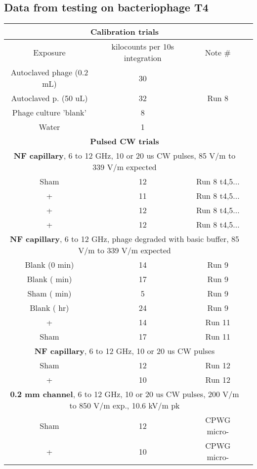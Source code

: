\documentclass[paper.tex]{subfiles}
\begin{document}
\subsection{Data from testing on bacteriophage T4}

\begin{table}[h!]
	\centering
	\begin{tabular}{ |c|c|c|c| } 
				\hline
		\multicolumn{3}{|c|}{\textbf{Calibration trials} } \\
		\hline
		\hline
		Exposure & kilocounts per 10s integration & Note \# \\
		\hline
		Autoclaved phage (0.2 mL) & 30 & \\ 
		Autoclaved p. (50 uL) & 32 & Run 8\\ 
		\hline
		Phage culture 'blank' & 8 & \\ 
		Water & 1 & \\

		\hline
\multicolumn{3}{|c|}{\textbf{Pulsed CW trials}} \\
\hline


		\hline
		\multicolumn{3}{|c|}{\textbf{NF capillary}, 6 to 12 GHz, 10 or 20 us CW pulses, 85 V/m to 339 V/m expected} \\
		\hline
		Sham   & 12 & Run 8 t4,5...\\
		+ & 11 & Run 8 t4,5...\\
		+  & 12 & Run 8 t4,5...\\
		+  & 12 & Run 8 t4,5...\\
		\hline
		\multicolumn{3}{|c|}{\textbf{NF capillary}, 6 to 12 GHz, phage degraded with basic buffer, 85 V/m to 339 V/m expected} \\
		\hline
		Blank (0 min) & 14 & Run 9 \\
		Blank (\ntilde 15 min) & 17 & Run 9\\
		Sham (\ntilde 15 min) & 5 & Run 9\\
		Blank (\ntilde 4 hr) & 24 & Run 9\\
		\hline
		+  & 14 & Run 11\\
		Sham & 17 & Run 11\\
		\hline
		\multicolumn{3}{|c|}{\textbf{NF capillary}, 6 to 12 GHz, 10 or 20 us CW pulses} \\
		\hline
		Sham & 12 & Run 12\\
		+    & 10 & Run 12\\
		\hline
		\multicolumn{3}{|c|}{\textbf{0.2 mm channel}, 6 to 12 GHz, 10 or 20 us CW pulses, 200 V/m to 850 V/m exp., 10.6 kV/m pk} \\
		\hline
		 Sham & 12 & CPWG micro-\\
 		 +    & 10 & CPWG micro-\\


\end{tabular}
\end{table}
\end{document}
